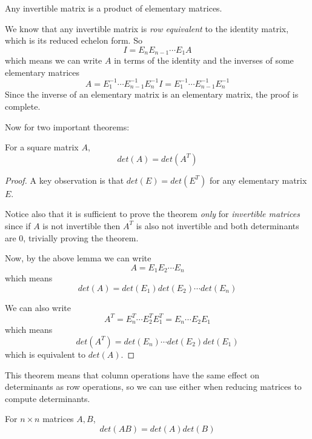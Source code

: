 \begin{lemma}
Any invertible matrix is a product of elementary matrices.
\end{lemma}

\begin{lproof}
We know that any invertible matrix is \textit{row equivalent} to the identity matrix, which is its reduced echelon form. So 
$$I = E_{n} E_{n-1} \cdots E_{1} A$$
which means we can write $A$ in terms of the identity and the inverses of some elementary  matrices 
$$A = E_{1}^{-1} \cdots E_{n-1}^{-1} E_{n}^{-1} I = E_{1}^{-1} \cdots E_{n-1}^{-1} E_{n}^{-1}$$
Since the inverse of an elementary matrix is an elementary matrix, the proof is complete. 
\end{lproof} 

Now for two important theorems:

\begin{theorem}
For a square matrix $A$, 
$$det(A) = det(A^{T})$$
\end{theorem}

\begin{proof}
A key observation is that $det(E) = det(E^{T})$ for any elementary matrix $E$. 

Notice also that it is sufficient to prove the theorem \textit{only} for \textit{invertible matrices} since if $A$ is not invertible then $A^{T}$ is also not invertible and both determinants are 0, trivially proving the theorem. 

Now, by the above lemma we can write
$$A = E_{1} E_{2} \cdots E_{n}$$
which means 
$$det(A) = det(E_{1}) det(E_{2}) \cdots det(E_{n})$$

We can also write 
$$A^{T} = E_{n}^{T} \cdots E_{2}^{T} E_{1}^{T} = E_{n} \cdots E_{2} E_{1}$$
which means 
$$det(A^{T}) = det(E_{n}) \cdots det(E_{2}) det(E_{1})$$
which is equivalent to $det(A)$. 
\end{proof}

This theorem means that column operations have the same effect on determinants as row operations, so we can use either when reducing matrices to compute determinants. 

\begin{theorem}
For $n \times n$ matrices $A, B$, 
$$det(AB) = det(A) det(B)$$
\end{theorem}

